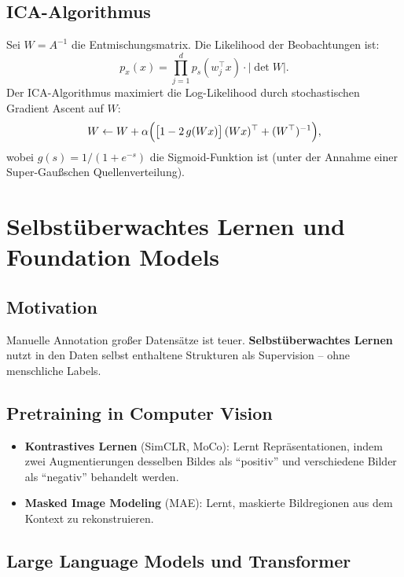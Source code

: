 \documentclass[11pt]{article}
\theoremstyle{csthm}
\theoremstyle{csdef}
\newcommand{\T}{^\top}
\begin{document}
\subsection{ICA-Algorithmus}

Sei $W = A^{-1}$ die Entmischungsmatrix. Die Likelihood der Beobachtungen ist:
\begin{equation}
  p_x(x) = \prod_{j=1}^d p_s(w_j\T x) \cdot |\det W|.
\end{equation}
Der ICA-Algorithmus maximiert die Log-Likelihood durch stochastischen
Gradient Ascent auf $W$:
\begin{equation}
  W \leftarrow W + \alpha
  \Bigl(\bigl[1 - 2\,g(Wx)\bigr]\,(Wx)\T + (W\T)^{-1}\Bigr),
\end{equation}
wobei $g(s) = 1/(1+e^{-s})$ die Sigmoid-Funktion ist (unter der Annahme
einer Super-Gaußschen Quellenverteilung).

\section{Selbstüberwachtes Lernen und Foundation Models}

\subsection{Motivation}

Manuelle Annotation großer Datensätze ist teuer. \textbf{Selbstüberwachtes
Lernen} nutzt in den Daten selbst enthaltene Strukturen als Supervision
-- ohne menschliche Labels.

\subsection{Pretraining in Computer Vision}

\begin{itemize}
  \item \textbf{Kontrastives Lernen} (SimCLR, MoCo): Lernt Repräsentationen,
        indem zwei Augmentierungen desselben Bildes als ``positiv'' und
        verschiedene Bilder als ``negativ'' behandelt werden.
  \item \textbf{Masked Image Modeling} (MAE): Lernt, maskierte Bildregionen
        aus dem Kontext zu rekonstruieren.
\end{itemize}

\subsection{Large Language Models und Transformer}
\end{document}
